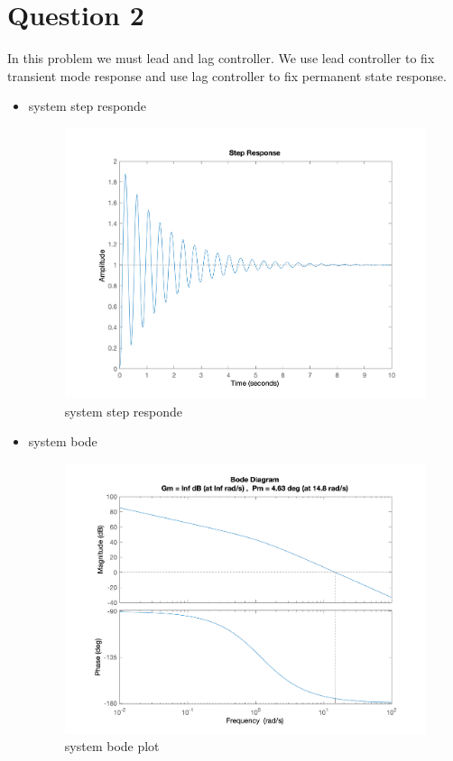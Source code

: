 \section{Question 2}
In this problem we must lead and lag controller. We use lead controller to fix transient mode response and use lag controller to fix permanent state response.
\newpage
\begin{itemize}
    \item system step responde
    \begin{figure}[H]
        \caption{system step responde}
        \centering
        \includegraphics[width=12cm]{../Figure/Q2/Q2_system_respond.png}
    \end{figure}
    \item system bode
    \begin{figure}[H]
        \caption{system bode plot}
        \centering
        \includegraphics[width=12cm]{../Figure/Q2/Q2_system_margin.png}

\end{figure}
\end{itemize}
